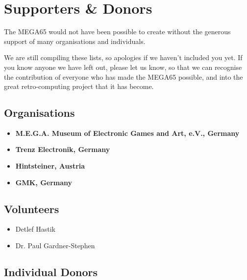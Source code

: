 \chapter{Supporters \& Donors}

The MEGA65 would not have been possible to create without the generous support
of many organisations and individuals.

We are still compiling these lists, so apologies if we haven't included you yet.  If you
know anyone we have left out, please let us know, so that we can recognise the contribution
of everyone who has made the MEGA65 possible, and into the great retro-computing project
that it has become.

\section{Organisations}

\begin{itemize}
\item {\bf M.E.G.A. Museum of Electronic Games and Art, e.V., Germany} 
\item {\bf Trenz Electronik, Germany} 
\item {\bf Hintsteiner, Austria} 
\item {\bf GMK, Germany} 
\end{itemize}

\section{Volunteers}

\begin{itemize}
\item Detlef Hastik    
\item Dr. Paul Gardner-Stephen   
\end{itemize}

\section{Individual Donors}


